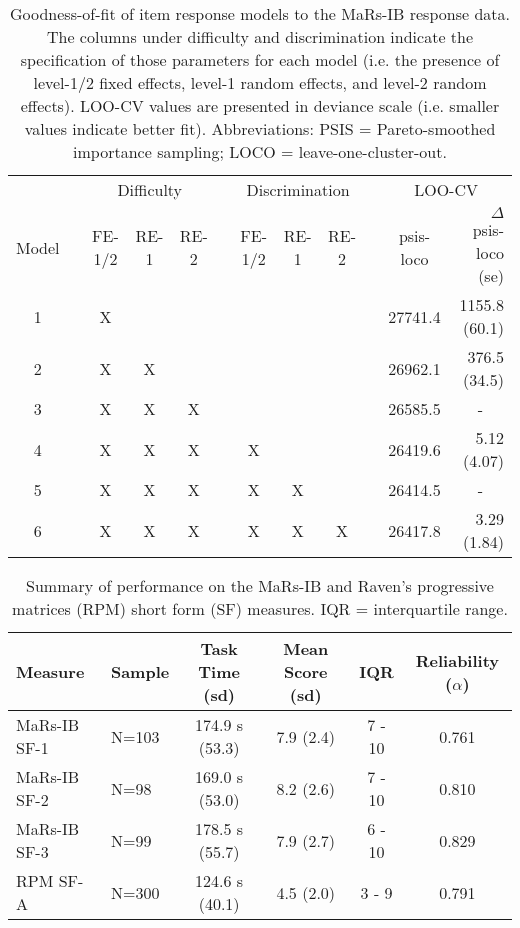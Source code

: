 \documentclass[a4paper,man,natbib]{apa6}
\begin{document}
\begin{table}
    \centering
    \begin{tabular*}{1.02\textwidth}{cccccccccccr}
    \toprule
    && \multicolumn{3}{c}{Difficulty} && \multicolumn{3}{c}{Discrimination} && \multicolumn{2}{c}{LOO-CV} \\
    \cmidrule(lr){3-5}\cmidrule(lr){7-9}\cmidrule(lr){11-12}
    Model && {\small FE-1/2} & {\small RE-1} & {\small RE-2} && {\small FE-1/2} & {\small RE-1} & {\small RE-2} && psis-loco & $\Delta$ psis-loco (se) \\
    \midrule
    1 && X &   &   &&   &   &   && 27741.4 & 1155.8 (60.1) \\
    2 && X & X &   &&   &   &   && 26962.1 & 376.5 (34.5) \\
    3 && X & X & X &&   &   &   && 26585.5 & \multicolumn{1}{c}{-} \\
    \midrule
    4 && X & X & X && X &   &   && 26419.6 & 5.12 (4.07) \\
    5 && X & X & X && X & X &   && 26414.5 & \multicolumn{1}{c}{-} \\
    6 && X & X & X && X & X & X && 26417.8 & 3.29 (1.84) \\
    \bottomrule
    \end{tabular*}
    \caption{\label{tab:2}\normalfont Goodness-of-fit of item response models to the MaRs-IB response data. The columns under difficulty and discrimination indicate the specification of those parameters for each model (i.e. the presence of level-1/2 fixed effects, level-1 random effects, and level-2 random effects). LOO-CV values are presented in deviance scale (i.e. smaller values indicate better fit). Abbreviations: PSIS = Pareto-smoothed importance sampling; LOCO = leave-one-cluster-out.}
    \label{table:2}
\end{table}

\begin{table}
    \centering
    \begin{tabular*}{\textwidth}{llcccc}
    \toprule
    Measure & Sample & Task Time (sd) & Mean Score (sd) & IQR & Reliability ($\alpha$) \\
    \midrule
    MaRs-IB SF-1 & N=103 & 174.9 s (53.3) & 7.9 (2.4) & 7 - 10 & 0.761 \\
    MaRs-IB SF-2 & N=98  & 169.0 s (53.0) & 8.2 (2.6) & 7 - 10 & 0.810 \\
    MaRs-IB SF-3 & N=99  & 178.5 s (55.7) & 7.9 (2.7) & 6 - 10 & 0.829 \\
    RPM SF-A     & N=300 & 124.6 s (40.1) & 4.5 (2.0) & 3 - 9 & 0.791 \\
    \bottomrule
    \end{tabular*}
    \caption{\label{table:3}\normalfont Summary of performance on the MaRs-IB and Raven's progressive matrices (RPM) short form (SF) measures. IQR = interquartile range.}
\end{table}
\end{document}
